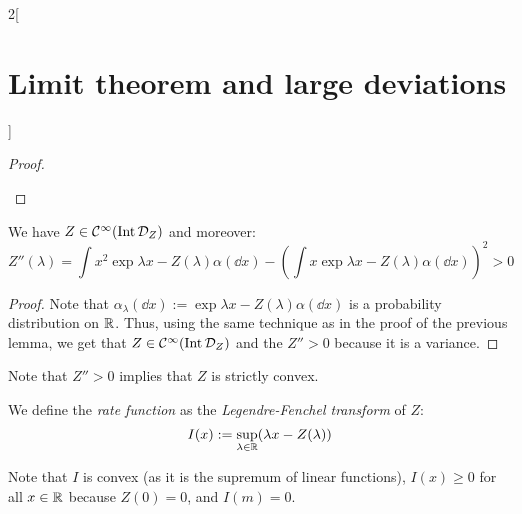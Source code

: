 \documentclass[../../../main_math.tex]{subfiles}
\begin{document}
\begin{multicols}{2}[\section{Limit theorem and large deviations}]
\begin{proof}
\begin{enumerate}
    \end{enumerate}
  \end{proof}
  \begin{corollary}
    We have $Z\in\mathcal{C}^\infty(\operatorname{Int}\mathcal{D}_Z)$ and moreover:
    $$
      Z''(\lambda)=\int x^2\exp{\lambda x-Z(\lambda)}\alpha(\dd{x})-{\left(\int x\exp{\lambda x-Z(\lambda)}\alpha(\dd{x})\right)}^2>0
    $$
  \end{corollary}
  \begin{proof}
    Note that $\alpha_\lambda(\dd{x}):=\exp{\lambda x-Z(\lambda)}\alpha(\dd{x})$ is a probability distribution on $\mathbb{R}$. Thus, using the same technique as in the proof of the previous lemma, we get that $Z\in\mathcal{C}^\infty(\operatorname{Int}\mathcal{D}_Z)$ and the $Z''>0$ because it is a variance.
  \end{proof}
  \begin{remark}
    Note that $Z''>0$ implies that $Z$ is strictly convex.
  \end{remark}
  \begin{definition}
    We define the \emph{rate function} as the \emph{Legendre-Fenchel transform} of $Z$:
    $$
      I(x):=\sup_{\lambda\in\mathbb{R}}(\lambda x-Z(\lambda))
    $$
  \end{definition}
  \begin{remark}
    Note that $I$ is convex (as it is the supremum of linear functions), $I(x)\geq 0$ for all $x\in\mathbb{R}$ because $Z(0) = 0$, and $I(m)=0$.
  \end{remark}
\end{multicols}
\end{document}
